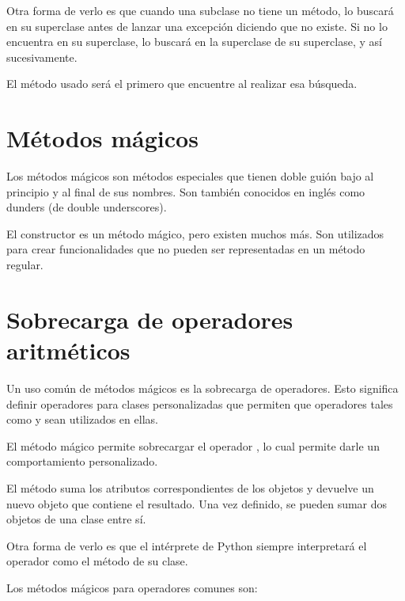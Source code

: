 
Otra forma de verlo es que cuando una subclase no tiene un método, lo buscará en su superclase antes de lanzar una excepción diciendo que no existe. Si no lo encuentra en su superclase, lo buscará en la superclase de su superclase, y así sucesivamente.\smallskip

El método usado será el primero que encuentre al realizar esa búsqueda.

\section{Métodos mágicos}

Los métodos mágicos son métodos especiales que tienen doble guión bajo al principio y al final de sus nombres. Son también conocidos en inglés como dunders (de double underscores).\smallskip

El constructor  es un método mágico, pero existen muchos más. Son utilizados para crear funcionalidades que no pueden ser representadas en un método regular.

\section{Sobrecarga de operadores aritméticos}

Un uso común de métodos mágicos es la sobrecarga de operadores. Esto significa definir operadores para clases personalizadas que permiten que operadores tales como \ttt{+} y \ttt{*} sean utilizados en ellas.\smallskip

El método mágico  permite sobrecargar el operador \ttt{+}, lo cual permite darle un comportamiento personalizado.


El método  suma los atributos correspondientes de los objetos y devuelve un nuevo objeto que contiene el resultado. Una vez definido, se pueden sumar dos objetos de una clase entre sí.\smallskip

Otra forma de verlo es que el intérprete de Python siempre interpretará el operador \ttt{+} como el método  de su clase.\smallskip

Los métodos mágicos para operadores comunes son:


